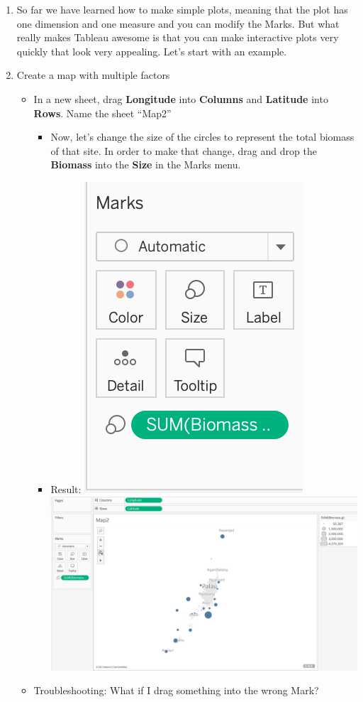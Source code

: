 \documentclass[
]{book}
\providecommand{\tightlist}{%
  \setlength{\itemsep}{0pt}\setlength{\parskip}{0pt}}
\begin{document}
\begin{enumerate}
\def\labelenumi{\arabic{enumi}.}
\item
  So far we have learned how to make simple plots, meaning that the plot has one dimension and one measure and you can modify the Marks. But what really makes Tableau awesome is that you can make interactive plots very quickly that look very appealing. Let's start with an example.
\item
  Create a map with multiple factors

  \begin{itemize}
  \tightlist
  \item
    In a new sheet, drag \textbf{Longitude} into \textbf{Columns} and \textbf{Latitude} into \textbf{Rows}. Name the sheet ``Map2''

    \begin{itemize}
    \tightlist
    \item
      Now, let's change the size of the circles to represent the total biomass of that site. In order to make that change, drag and drop the \textbf{Biomass} into the \textbf{Size} in the Marks menu.
    \item
      Result:
      \includegraphics{images/M3S3-Biomass_in_size.png}
      \includegraphics{images/M3S3-map_view_biomass_in_size.png}
    \end{itemize}
  \item
    Troubleshooting: What if I drag something into the wrong Mark?


\end{itemize}
\end{enumerate}
\end{document}
